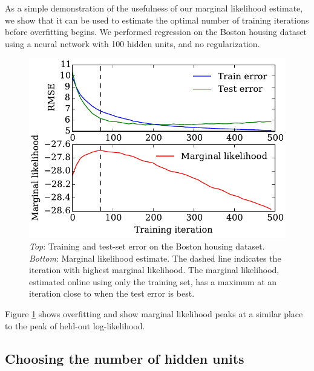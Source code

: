 \documentclass[]{article}
\begin{document}
As a simple demonstration of the usefulness of our marginal likelihood estimate, we show that it can be used to estimate the optimal number of training iterations before overfitting begins.
We performed regression on the Boston housing dataset 
using a neural network with 100 hidden units, and no regularization.

\begin{figure}[h!]
\begin{center}
\includegraphics[width=\columnwidth]{../experiments/2015_03_01_housing/2/marglik}
\vskip -0.1in
\caption{\emph{Top}: Training and test-set error on the Boston housing dataset.
\emph{Bottom}: Marginal likelihood estimate.
The dashed line indicates the iteration with highest marginal likelihood.
The marginal likelihood, estimated online using only the training set, has a maximum at an iteration close to when the test error is best.}
\label{fig:housing}
\end{center}
\end{figure}


Figure \ref{fig:housing} shows overfitting and show marginal likelihood peaks at a similar place to the peak of held-out log-likelihood.

\subsection{Choosing the number of hidden units}
\end{document}
